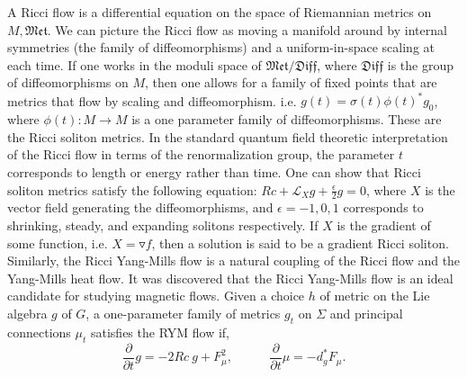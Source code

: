 \documentclass{article}
\begin{document}
    A Ricci flow is a differential equation on the space of Riemannian metrics on $M, \mathfrak{Met}$. We can picture the Ricci flow as moving a manifold around by internal symmetries (the family of diffeomorphisms) and a uniform-in-space scaling at each time. If one works in the moduli space of $\mathfrak{Met}/ \mathfrak{Diff}$, where $\mathfrak{Diff}$ is the group of diffeomorphisms on $M$, then one allows for a family of fixed points that are metrics that flow by scaling and diffeomorphism. i.e. $g(t) = \sigma (t) \phi (t) ^* g_0$,
    where $\phi(t) :M \rightarrow M$ is a one parameter family of diffeomorphisms. 
    These are the Ricci soliton metrics. 
    In the standard quantum field theoretic interpretation of the Ricci flow in terms of the renormalization group, the parameter $t$ corresponds to length or energy rather than time.
    One can show that Ricci soliton metrics satisfy the following equation: $Rc+\mathcal{L}_X g+ 
    \frac{\epsilon}{2} g = 0$, where $X$ is the vector field generating the diffeomorphisms, and $\epsilon = -1,0,1$ corresponds to shrinking, steady, and expanding solitons respectively. If $X$ is the gradient of some function, i.e. $X=\triangledown f$, then a solution is said to be a gradient Ricci soliton. 
    Similarly, the Ricci Yang-Mills flow is a natural coupling of the Ricci flow and the Yang-Mills heat flow. It was discovered that the Ricci Yang-Mills flow is an ideal candidate for studying magnetic flows. Given a choice $h$ of metric on the Lie algebra $g$ of $G$, a one-parameter family of metrics $g_t$ on $\Sigma$ and principal connections $\mu_t$ satisfies the RYM flow if, 
    \begin{equation}
        \frac{\partial}{\partial t} g = -2 Rc \ g + F^2_\mu,  \ \ \ \ \ \ \ \ \ \ \ \ \ 
        \frac{\partial}{\partial t}\mu = -d^*_gF_\mu .
    \end{equation}
    
\end{document}
